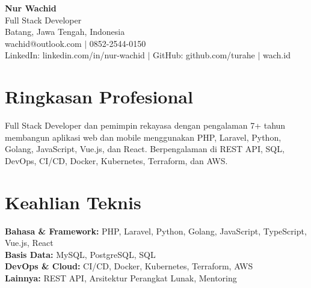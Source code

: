 \begin{center}
  {\LARGE\bfseries Nur Wachid}\\[3pt]
  Full Stack Developer\\[2pt]
  Batang, Jawa Tengah, Indonesia\\[2pt]
  wachid@outlook.com $|$ 0852-2544-0150\\[1pt]
  LinkedIn: linkedin.com/in/nur-wachid $|$ GitHub: github.com/turahe $|$ wach.id
\end{center}
\section*{Ringkasan Profesional}
Full Stack Developer dan pemimpin rekayasa dengan pengalaman 7+ tahun membangun aplikasi web dan mobile menggunakan PHP, Laravel, Python, Golang, JavaScript, Vue.js, dan React. Berpengalaman di REST API, SQL, DevOps, CI/CD, Docker, Kubernetes, Terraform, dan AWS.
\section*{Keahlian Teknis}
\textbf{Bahasa \& Framework:} PHP, Laravel, Python, Golang, JavaScript, TypeScript, Vue.js, React\\[1pt]
\textbf{Basis Data:} MySQL, PostgreSQL, SQL\\[1pt]
\textbf{DevOps \& Cloud:} CI/CD, Docker, Kubernetes, Terraform, AWS\\[1pt]
\textbf{Lainnya:} REST API, Arsitektur Perangkat Lunak, Mentoring
